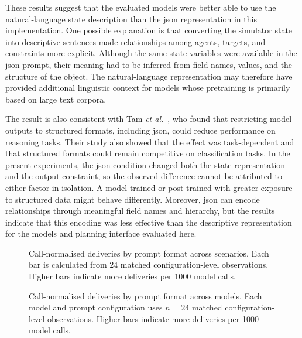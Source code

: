 These results suggest that the evaluated models were better able to use the natural-language state description than the \gls{json} representation in this implementation. One possible explanation is that converting the simulator state into descriptive sentences made relationships among agents, targets, and constraints more explicit. Although the same state variables were available in the \gls{json} prompt, their meaning had to be inferred from field names, values, and the structure of the object. The natural-language representation may therefore have provided additional linguistic context for models whose pretraining is primarily based on large text corpora.

The result is also consistent with Tam \textit{et al.}~\cite{tam2024letmespeak}, who found that restricting model outputs to structured formats, including \gls{json}, could reduce performance on reasoning tasks. Their study also showed that the effect was task-dependent and that structured formats could remain competitive on classification tasks. In the present experiments, the \gls{json} condition changed both the state representation and the output constraint, so the observed difference cannot be attributed to either factor in isolation. A model trained or post-trained with greater exposure to structured data might behave differently. Moreover, \gls{json} can encode relationships through meaningful field names and hierarchy, but the results indicate that this encoding was less effective than the descriptive representation for the models and planning interface evaluated here.

\begin{figure}[H]
\centering
\ChartPromptScenarios
\caption{Call-normalised deliveries by prompt format across scenarios. Each bar is calculated from 24 matched configuration-level observations. Higher bars indicate more deliveries per 1000 model calls.}
\label{fig:prompt_efficiency_scenarios}
\end{figure}

\begin{figure}[H]
\centering
\ChartPromptModels
\caption{Call-normalised deliveries by prompt format across models. Each model and prompt configuration uses $n=24$ matched configuration-level observations. Higher bars indicate more deliveries per 1000 model calls.}
\label{fig:prompt_efficiency_models}
\end{figure}


